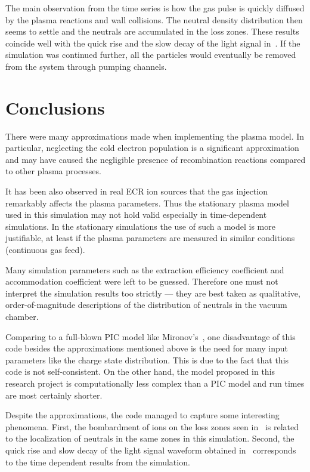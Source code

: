 \documentclass[a4paper,twoside,12pt]{article}
\begin{document}
The main observation from the time series is how the gas pulse is quickly
diffused by the plasma reactions and wall collisions. The neutral density
distribution then seems to settle and the neutrals are accumulated in the loss
zones. These results coincide well with the quick rise and the slow decay of
the light signal in~\cite{kronholm:ecr}. If the simulation was continued
further, all the particles would eventually be removed from the system through
pumping channels.

\section{Conclusions}

There were many approximations made when implementing the plasma model.
In particular, neglecting the cold electron population is a significant
approximation and may have caused the negligible presence of
recombination reactions compared to other plasma processes.

It has been also observed in real ECR ion sources that the gas injection
remarkably affects the plasma parameters. Thus the stationary plasma model used
in this simulation may not hold valid especially in time-dependent simulations.
In the stationary simulations the use of such a model is more justifiable, at
least if the plasma parameters are measured in similar conditions (continuous
gas feed).

Many simulation parameters such as the extraction efficiency coefficient and
accommodation coefficient were left to be guessed. Therefore one must not
interpret the simulation results too strictly --- they are best taken as
qualitative, order-of-magnitude descriptions of the distribution of neutrals in
the vacuum chamber.

Comparing to a full-blown PIC model like Mironov's~\cite{mironov:ecr}, one
disadvantage of this code besides the approximations mentioned above is the
need for many input parameters like the charge state distribution. This is due
to the fact that this code is not self-consistent. On the other hand, the model
proposed in this research project is computationally less complex than a PIC model
and run times are most certainly shorter.

Despite the approximations, the code managed to capture some interesting
phenomena. First, the bombardment of ions on the loss zones seen
in~\cite{kalvas:hiisi} is related to the localization of neutrals in the same
zones in this simulation. Second, the quick rise and slow decay of the light
signal waveform obtained in~\cite{kronholm:ecr} corresponds to the time
dependent results from the simulation.
\end{document}

